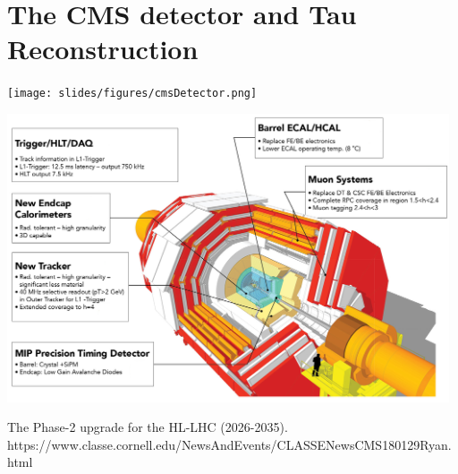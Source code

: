 \section{The CMS detector and Tau Reconstruction}
\begin{frame}{}
    \begin{center}
        \texttt{[image: slides/figures/cmsDetector.png]}
    \end{center}
\end{frame}

\begin{frame}{}
    \begin{center}
        \includegraphics[width=0.98\textwidth]{slides/figures/CMS_NSF_DOE.jpeg}
    \end{center}
    The Phase-2 upgrade for the HL-LHC (2026-2035). \tiny{ https://www.classe.cornell.edu/NewsAndEvents/CLASSENewsCMS180129Ryan.html}
\end{frame}






        
